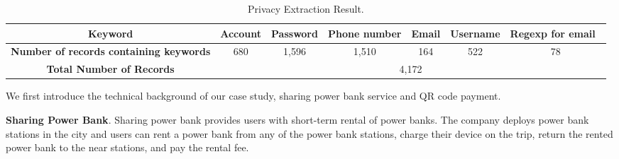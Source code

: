 \begin{table}[t]
	\centering
	\begin{tabular}{|c|c|c|c|c|c|c|}
		\hline
		\textbf{Keyword}                               & Account & Password & Phone number & Email & Username & Regexp for email~  \\
		\hline
		\textbf{Number of records containing keywords} & 680     & 1,596     & 1,510         & 164   & 522      & 78                 \\
		\hline
		\textbf{Total Number of Records} & \multicolumn{6}{c|}{4,172} \\
		\hline
	\end{tabular}
	\linebreak
	\caption{Privacy Extraction Result.}
	\label{table:information_extracted}
\end{table}

We first introduce the technical background of our case study, sharing power
bank service and QR code payment.

\textbf{Sharing Power Bank}.  Sharing power bank provides users with short-term
rental of power banks.  The company deploys power bank stations in the city and
users can rent a power bank from any of the power bank stations, charge their
device on the trip, return the rented power bank to the near stations, and pay
the rental fee.

